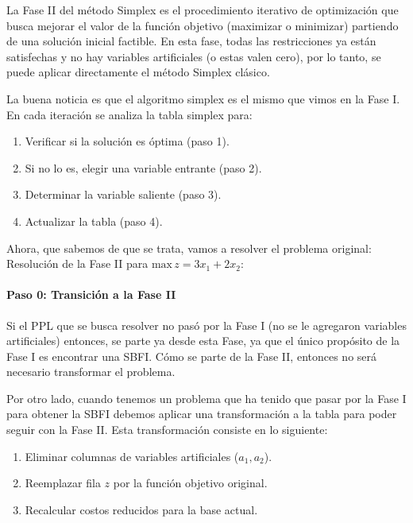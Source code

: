 La Fase II del método Simplex es el procedimiento iterativo de optimización que busca mejorar el valor de la función objetivo (maximizar o minimizar) partiendo de una solución inicial factible. En esta fase, todas las restricciones ya están satisfechas y no hay variables artificiales (o estas valen cero), por lo tanto, se puede aplicar directamente el método Simplex clásico.

La buena noticia es que el algoritmo simplex es el mismo que vimos en la Fase I. En cada iteración se analiza la tabla simplex para:
\begin{enumerate}
  \item Verificar si la solución es óptima (paso 1).
  \item Si no lo es, elegir una variable entrante (paso 2).
  \item Determinar la variable saliente (paso 3).
  \item Actualizar la tabla (paso 4).  
\end{enumerate}

Ahora, que sabemos de que se trata, vamos a resolver el problema original: Resolución de la Fase II para \(\text{max}\, z = 3x_1 + 2x_2\):

\paragraph{Paso 0: Transición a la Fase II}

Si el PPL que se busca resolver no pasó por la Fase I (no se le agregaron variables artificiales) entonces, se parte ya desde esta Fase, ya que el único propósito de la Fase I es encontrar una SBFI. Cómo se parte de la Fase II, entonces no será necesario transformar el problema.

Por otro lado, cuando tenemos un problema que ha tenido que pasar por la Fase I para obtener la SBFI debemos aplicar una transformación a la tabla para poder seguir con la Fase II. Esta transformación consiste en lo siguiente:
\begin{enumerate}
  \item Eliminar columnas de variables artificiales (\(a_1, a_2\)).
  \item Reemplazar fila \(z\) por la función objetivo original. 
  \item Recalcular costos reducidos para la base actual.
\end{enumerate}


